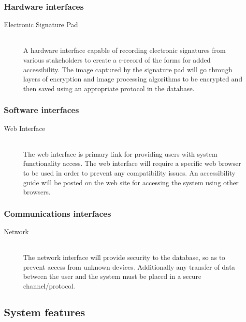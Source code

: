 \documentclass{journal}
\begin{document}
\subsubsection{Hardware interfaces}

\begin{description}
\item[Electronic Signature Pad]\hfill \\
		A hardware interface capable of recording electronic signatures from various stakeholders to create a e-record of the forms for added accessibility. The image captured by the signature pad will go through layers of encryption and image processing algorithms to be encrypted and then saved using an appropriate protocol in the database. 
		\end{description}

		\subsubsection{Software interfaces}
		\begin{description}
		\item[Web Interface]\hfill \\
			The web interface is primary link for providing users with system functionality access. The web interface will require a specific web browser to be used in order to prevent any compatibility issues. An accessibility guide will be posted on the web site for accessing the system using other browsers. 
			\end{description}

			\subsubsection{Communications interfaces}
			\begin{description}
			\item[Network]\hfill \\
				The network interface will provide security to the database, so as to prevent access from unknown devices. Additionally any transfer of data between the user and the system must be placed in a secure channel/protocol.  
				\end{description}


				\subsection{System features}
\end{document}
